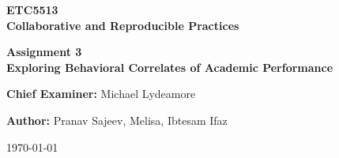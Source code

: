 \begin{titlepage}
    \centering
    \vspace*{3.5cm}
    
    {\Huge\bfseries ETC5513 \\[0.3cm]
    Collaborative and Reproducible Practices \par}
    
    \vspace{1.5cm}
    
    {\LARGE\bfseries Assignment 3 \\[0.2cm]
    Exploring Behavioral Correlates of Academic Performance \par}
    
    \vspace{1.5cm}
    
    {\large\textbf{Chief Examiner:} Michael Lydeamore \par}
    
    \vspace{1.5cm}
    
    {\large\textbf{Author:} Pranav Sajeev, Melisa, Ibtesam Ifaz \par}
    
    \vfill
    
    {\large\today}
\end{titlepage}

\clearpage
